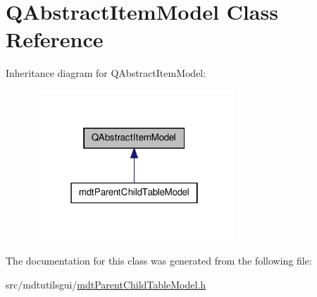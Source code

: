 \hypertarget{class_q_abstract_item_model}{\section{Q\-Abstract\-Item\-Model Class Reference}
\label{class_q_abstract_item_model}
}


Inheritance diagram for Q\-Abstract\-Item\-Model\-:
\nopagebreak
\begin{figure}[H]
\begin{center}
\leavevmode
\includegraphics[width=214pt]{class_q_abstract_item_model__inherit__graph}
\end{center}
\end{figure}


The documentation for this class was generated from the following file\-:\begin{DoxyCompactItemize}
\item 
src/mdtutilsgui/\hyperlink{mdt_parent_child_table_model_8h}{mdt\-Parent\-Child\-Table\-Model.\-h}\end{DoxyCompactItemize}
